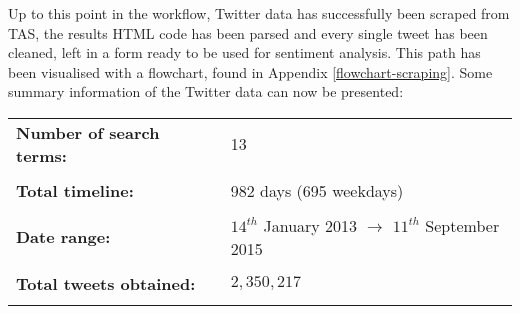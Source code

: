 \documentclass{article}
\begin{document}
Up to this point in the workflow, Twitter data has successfully been scraped from TAS, the results HTML code has been parsed and every single tweet has been cleaned, left in a form ready to be used for sentiment analysis. This path has been visualised with a flowchart, found in Appendix \ref{flowchart-scraping}. Some summary information of the Twitter data can now be presented:

\vspace{3mm}


\begin{center}
\begin{tabular}{lll}
\textbf{Number of search terms:} &  & 13\\
 &  & \\
\textbf{Total timeline:} &  & 982 days (695 weekdays)\\
 &  & \\
\textbf{Date range:} &  & $14^{th}$ January 2013 $\rightarrow$ $11^{th}$ September 2015\footnotemark\\
 &  & \\
\textbf{Total tweets obtained:} &  & $2,350,217$\\
 &  & \\
\end{tabular}
\end{center}


\vspace{3mm}
\end{document}
